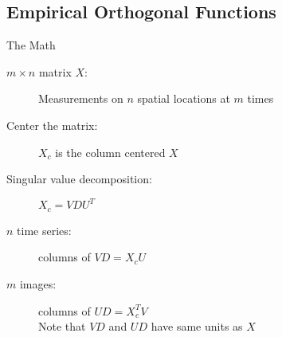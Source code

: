 \subsection{Empirical Orthogonal Functions}

\begin{frame}
  \begin{block}{The Math}\pause
  \begin{description}
    \item[$m\times n$ matrix $X$:] Measurements on $n$ spatial locations at
    $m$ times
    \item[Center the matrix:] $X_c$ is the column centered $X$ \\
    \item[Singular value decomposition:] $X_c = VDU^T$ \\
    \item[$n$ time series:] columns of $VD = X_cU$ \\
    \item[$m$ images:] columns of $UD = X_c^TV$ \\
    Note that $VD$ and $UD$ have same units as $X$
  \end{description}
  \end{block}
\end{frame}

